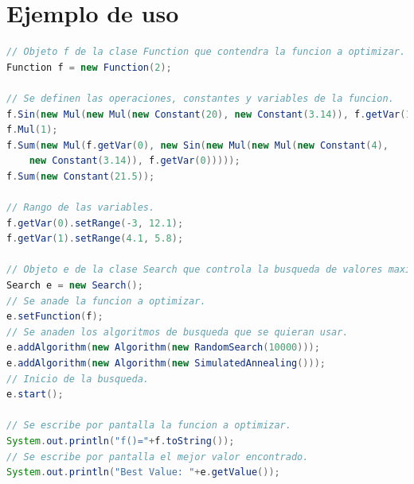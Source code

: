 \documentclass{article}
\theoremstyle{definition}
\theoremstyle{remark}
\begin{document}
\section{Ejemplo de uso}
\begin{lstlisting}[language=Java]
// Objeto f de la clase Function que contendra la funcion a optimizar.
Function f = new Function(2);

// Se definen las operaciones, constantes y variables de la funcion.
f.Sin(new Mul(new Mul(new Constant(20), new Constant(3.14)), f.getVar(1)));
f.Mul(1);
f.Sum(new Mul(f.getVar(0), new Sin(new Mul(new Mul(new Constant(4), 
	new Constant(3.14)), f.getVar(0)))));
f.Sum(new Constant(21.5));
        
// Rango de las variables.
f.getVar(0).setRange(-3, 12.1);
f.getVar(1).setRange(4.1, 5.8);
        
// Objeto e de la clase Search que controla la busqueda de valores maximos.
Search e = new Search();
// Se anade la funcion a optimizar.
e.setFunction(f);
// Se anaden los algoritmos de busqueda que se quieran usar.
e.addAlgorithm(new Algorithm(new RandomSearch(10000)));
e.addAlgorithm(new Algorithm(new SimulatedAnnealing()));
// Inicio de la busqueda.
e.start();
        
// Se escribe por pantalla la funcion a optimizar.
System.out.println("f()="+f.toString());
// Se escribe por pantalla el mejor valor encontrado.
System.out.println("Best Value: "+e.getValue());
\end{lstlisting}
\end{document}
